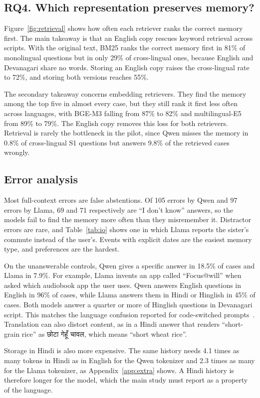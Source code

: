 \documentclass[11pt]{article}
\newcommand{\hi}[1]{\foreignlanguage{hindi}{#1}}
\begin{document}
\subsection{RQ4. Which representation preserves memory?}
Figure~\ref{fig:retrieval} shows how often each retriever ranks the correct memory first.
The main takeaway is that an English copy rescues keyword retrieval across scripts.
With the original text, BM25 ranks the correct memory first in 81\% of monolingual questions but in only 29\% of cross-lingual ones, because English and Devanagari share no words.
Storing an English copy raises the cross-lingual rate to 72\%, and storing both versions reaches 55\%.

The secondary takeaway concerns embedding retrievers.
They find the memory among the top five in almost every case, but they still rank it first less often across languages, with BGE-M3 falling from 87\% to 82\% and multilingual-E5 from 89\% to 79\%.
The English copy removes this loss for both retrievers.
Retrieval is rarely the bottleneck in the pilot, since Qwen misses the memory in 0.8\% of cross-lingual S1 questions but answers 9.8\% of the retrieved cases wrongly.

\subsection{Error analysis}
Most full-context errors are false abstentions.
Of 105 errors by Qwen and 97 errors by Llama, 69 and 71 respectively are ``I don't know'' answers, so the models fail to find the memory more often than they misremember it.
Distractor errors are rare, and Table~\ref{tab:io} shows one in which Llama reports the sister's commute instead of the user's.
Events with explicit dates are the easiest memory type, and preferences are the hardest.

On the unanswerable controls, Qwen gives a specific answer in 18.5\% of cases and Llama in 7.9\%.
For example, Llama invents an app called ``Focus@will'' when asked which audiobook app the user uses.
Qwen answers English questions in English in 96\% of cases, while Llama answers them in Hindi or Hinglish in 45\% of cases.
Both models answer a quarter or more of Hinglish questions in Devanagari script.
This matches the language confusion reported for code-switched prompts~\citep{oh2026ola}.
Translation can also distort content, as in a Hindi answer that renders ``short-grain rice'' as \hi{छोटा गेहूँ चावल}, which means ``short wheat rice''.

Storage in Hindi is also more expensive.
The same history needs 4.1 times as many tokens in Hindi as in English for the Qwen tokenizer and 2.3 times as many for the Llama tokenizer, as Appendix~\ref{app:extra} shows.
A Hindi history is therefore longer for the model, which the main study must report as a property of the language.
\end{document}
